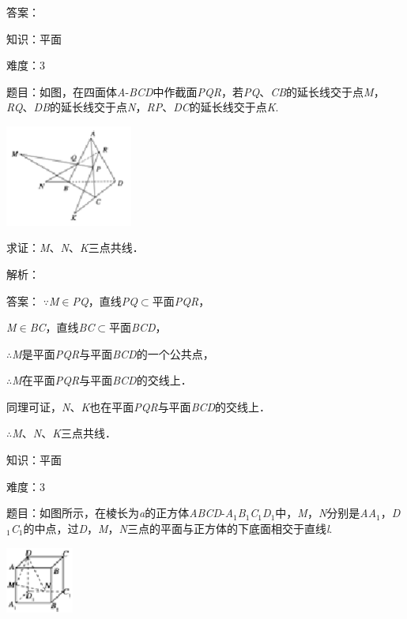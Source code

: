 \documentclass{article} %
\begin{document}
答案：\underbar{$\mathrm{\in}$}\textit{}

知识：平面

难度：3

题目：如图，在四面体\textit{A}-\textit{BCD}中作截面\textit{PQR}，若\textit{PQ}、\textit{CB}的延长线交于点\textit{M}，\textit{RQ}、\textit{DB}的延长线交于点\textit{N}，\textit{RP}、\textit{DC}的延长线交于点\textit{K}.

\includegraphics*[width=1.65in, height=1.31in, keepaspectratio=false]{image97}

求证：\textit{M}、\textit{N}、\textit{K}三点共线．

解析：

答案：
$\mathrm{\because}$\textit{M}$\mathrm{\in}$\textit{PQ}，直线\textit{PQ}$\mathrm{\subset }$平面\textit{PQR}，

\textit{M}$\mathrm{\in}$\textit{BC}，直线\textit{BC}$\mathrm{\subset }$平面\textit{BCD}，

$\mathrm{\therefore}$\textit{M}是平面\textit{PQR}与平面\textit{BCD}的一个公共点，

$\mathrm{\therefore}$\textit{M}在平面\textit{PQR}与平面\textit{BCD}的交线上．

同理可证，\textit{N}、\textit{K}也在平面\textit{PQR}与平面\textit{BCD}的交线上．

$\mathrm{\therefore}$\textit{M}、\textit{N}、\textit{K}三点共线．

知识：平面

难度：3

题目：如图所示，在棱长为\textit{a}的正方体\textit{ABCD}-\textit{A}${}_{1}$\textit{B}${}_{1}$\textit{C}${}_{1}$\textit{D}${}_{1}$中，\textit{M}，\textit{N}分别是\textit{AA}${}_{1}$，\textit{D}${}_{1}$\textit{C}${}_{1}$的中点，过\textit{D}，\textit{M}，\textit{N}三点的平面与正方体的下底面相交于直线\textit{l}.

\includegraphics*[width=0.87in, height=0.87in, keepaspectratio=false]{image98}
\end{document}
